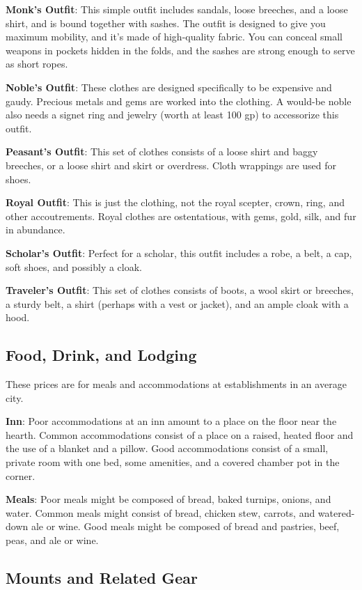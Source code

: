\textbf{Monk's Outfit}: This simple outfit includes sandals, loose breeches, and a loose shirt, and is bound together with sashes. The outfit is designed to give you maximum mobility, and it's made of high-quality fabric. You can conceal small weapons in pockets hidden in the folds, and the sashes are strong enough to serve as short ropes.
		
\textbf{Noble's Outfit}: These clothes are designed specifically to be expensive and gaudy. Precious metals and gems are worked into the clothing. A would-be noble also needs a signet ring and jewelry (worth at least 100 gp) to accessorize this outfit.
		
\textbf{Peasant's Outfit}: This set of clothes consists of a loose shirt and baggy breeches, or a loose shirt and skirt or overdress. Cloth wrappings are used for shoes.
		
\textbf{Royal Outfit}: This is just the clothing, not the royal scepter, crown, ring, and other accoutrements. Royal clothes are ostentatious, with gems, gold, silk, and fur in abundance.
		
\textbf{Scholar's Outfit}: Perfect for a scholar, this outfit includes a robe, a belt, a cap, soft shoes, and possibly a cloak.
		
\textbf{Traveler's Outfit}: This set of clothes consists of boots, a wool skirt or breeches, a sturdy belt, a shirt (perhaps with a vest or jacket), and an ample cloak with a hood.
	
\subsection{Food, Drink, and Lodging}

		
These prices are for meals and accommodations at establishments in an average city.
		
\textbf{Inn}: Poor accommodations at an inn amount to a place on the floor near the hearth. Common accommodations consist of a place on a raised, heated floor and the use of a blanket and a pillow. Good accommodations consist of a small, private room with one bed, some amenities, and a covered chamber pot in the corner.
		
\textbf{Meals}: Poor meals might be composed of bread, baked turnips, onions, and water. Common meals might consist of bread, chicken stew, carrots, and watered-down ale or wine. Good meals might be composed of bread and pastries, beef, peas, and ale or wine.
	
\subsection{Mounts and Related Gear}

